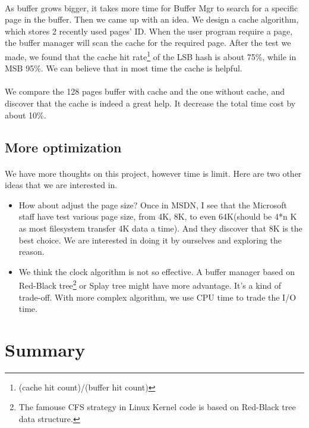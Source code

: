 \documentclass{article}
\begin{document}
        \paragraph{}
            As buffer grows bigger, it takes more time for Buffer Mgr to search for a specific page in the buffer. Then we came up with an idea. We design a cache algorithm, which stores 2 recently used pages' ID. When the user program require a page, the buffer manager will scan the cache for the required page. After the test we made, we found that the cache hit rate\footnote{(cache hit count)/(buffer hit count)} of the LSB hash is about 75\%, while in MSB 95\%. We can believe that in most time the cache is helpful. 
        \paragraph{}
            We compare the 128 pages buffer with cache and the one without cache, and discover that the cache is indeed a great help. It decrease the total time cost by about 10\%.
    \subsection{More optimization}
        \paragraph{}
            We have more thoughts on this project, however time is limit. Here are two other ideas that we are interested in.
        \begin{itemize}
            \item How about adjust the page size? Once in MSDN, I see that the Microsoft staff have test various page size, from 4K, 8K, to even 64K(should be 4*n K as most filesystem transfer 4K data a time). And they discover that 8K is the best choice. We are interested in doing it by ourselves and exploring the reason.
            \item We think the clock algorithm is not so effective. A buffer manager based on Red-Black tree\footnote{The famouse CFS strategy in Linux Kernel code is based on Red-Black tree data structure.} or Splay tree might have more advantage. It's a kind of trade-off. With more complex algorithm, we use CPU time to trade the I/O time.
        \end{itemize}
\section{Summary}
\end{document}
